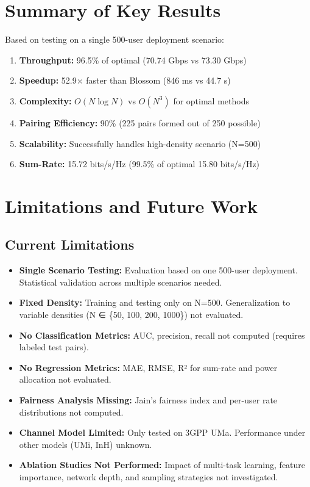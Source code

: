 \section{Summary of Key Results}

Based on testing on a single 500-user deployment scenario:

\begin{enumerate}
    \item \textbf{Throughput:} 96.5\% of optimal (70.74 Gbps vs 73.30 Gbps)
    \item \textbf{Speedup:} 52.9× faster than Blossom (846 ms vs 44.7 s)
    \item \textbf{Complexity:} $O(N \log N)$ vs $O(N^3)$ for optimal methods
    \item \textbf{Pairing Efficiency:} 90\% (225 pairs formed out of 250 possible)
    \item \textbf{Scalability:} Successfully handles high-density scenario (N=500)
    \item \textbf{Sum-Rate:} 15.72 bits/s/Hz (99.5\% of optimal 15.80 bits/s/Hz)
\end{enumerate}

\section{Limitations and Future Work}

\subsection{Current Limitations}

\begin{itemize}
    \item \textbf{Single Scenario Testing:} Evaluation based on one 500-user deployment. Statistical validation across multiple scenarios needed.
    
    \item \textbf{Fixed Density:} Training and testing only on N=500. Generalization to variable densities (N ∈ \{50, 100, 200, 1000\}) not evaluated.
    
    \item \textbf{No Classification Metrics:} AUC, precision, recall not computed (requires labeled test pairs).
    
    \item \textbf{No Regression Metrics:} MAE, RMSE, R² for sum-rate and power allocation not evaluated.
    
    \item \textbf{Fairness Analysis Missing:} Jain's fairness index and per-user rate distributions not computed.
    
    \item \textbf{Channel Model Limited:} Only tested on 3GPP UMa. Performance under other models (UMi, InH) unknown.
    
    \item \textbf{Ablation Studies Not Performed:} Impact of multi-task learning, feature importance, network depth, and sampling strategies not investigated.
\end{itemize}

